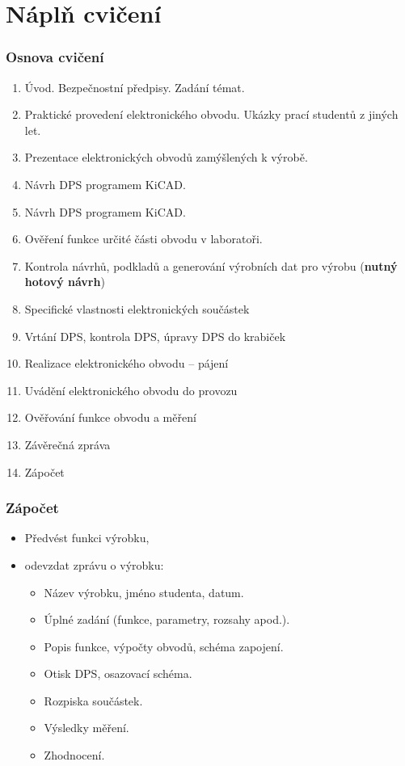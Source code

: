 \documentclass{beamer}
\begin{document}
\section{\texorpdfstring{Náplň cvičení}{Napln Cviceni}}
  \begin{frame}
    \frametitle{Osnova cvičení}
		\begin{enumerate}
          \small
          \item Úvod. Bezpečnostní předpisy. Zadání témat.
          \item Praktické provedení elektronického obvodu. Ukázky prací studentů z jiných let.
          \item Prezentace elektronických obvodů zamýšlených k výrobě.
          \item Návrh DPS programem KiCAD.
          \item Návrh DPS programem KiCAD.
          \item Ověření funkce určité části obvodu v laboratoři.
          \item Kontrola návrhů, podkladů a generování výrobních dat pro výrobu (\textbf{nutný hotový návrh})
          \item Specifické vlastnosti elektronických součástek
          \item Vrtání DPS, kontrola DPS, úpravy DPS do krabiček
          \item Realizace elektronického obvodu – pájení 
          \item Uvádění elektronického obvodu do provozu
          \item Ověřování funkce obvodu a měření
          \item Závěrečná zpráva
          \item Zápočet
		\end{enumerate}
	
	\end{frame}
	\begin{frame}
    \frametitle{Zápočet}
		
		\begin{itemize}
			\item Předvést funkci výrobku,
			\item odevzdat zprávu o výrobku:
      
      \begin{itemize}
        \item Název výrobku, jméno studenta, datum.
        \item Úplné zadání (funkce, parametry, rozsahy apod.).
        \item Popis funkce, výpočty obvodů, schéma zapojení.
        \item Otisk DPS, osazovací schéma.
        \item Rozpiska součástek.
        \item Výsledky měření.
        \item Zhodnocení.
      \end{itemize}
		\end{itemize}
	
	\end{frame}
\end{document}
